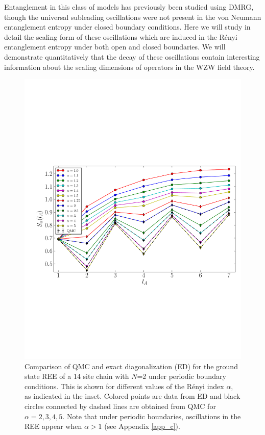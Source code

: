 \documentclass[aps,prb,reprint,floatfix]{revtex4-1}
\begin{document}
 
Entanglement in this class of models has previously been studied using DMRG,\cite{Fuhringer2008:DMRGSUN} though the universal subleading oscillations were not present in the von Neumann entanglement entropy under closed boundary conditions.  Here we will study in detail the scaling form of these oscillations which are induced in the R\'{e}nyi entanglement entropy under both open and closed boundaries. We will demonstrate quantitatively that the decay of these oscillations contain interesting information about the scaling dimensions of operators in the WZW field theory.

\begin{figure}[!t]
\centerline{\includegraphics[angle=0,width=0.95\columnwidth]{EDvsQMCsu2.pdf}}
\caption{Comparison of QMC and exact diagonalization (ED) for the ground state REE of a 14 site chain with $N$=2 under periodic boundary conditions. This is shown for different values of the R\'{e}nyi index $\alpha$, as indicated in the inset.  Colored points are data from ED and black circles connected by dashed lines are obtained from QMC for $\alpha=2,3,4,5$. Note that under periodic boundaries, oscillations in the REE appear when $\alpha>1$ (see Appendix \ref{app_c}).}
\label{fig:EDsu2}
\end{figure}
\end{document}
